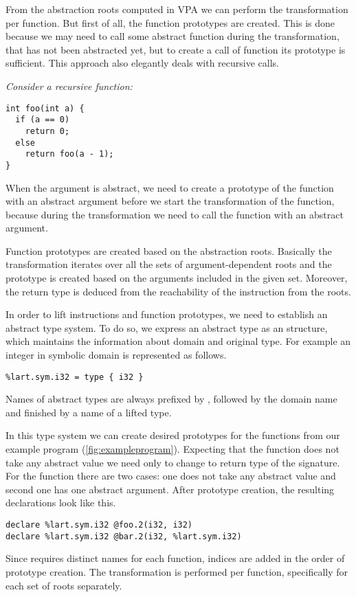 From the abstraction roots computed in VPA we can perform the transformation per
function. But first of all, the function prototypes are created. This is done
because we may need to call some abstract function during the transformation,
that has not been abstracted yet, but to create a call of function its prototype
is sufficient. This approach also elegantly deals with recursive calls.
\begin{marginfigure}
\itshape
Consider a recursive function:
\begin{verbatim}
int foo(int a) {
  if (a == 0)
    return 0;
  else
    return foo(a - 1);
}
\end{verbatim}
    When the argument  is abstract, we need to create a prototype of
    the function  with an abstract argument before we start the
    transformation of the function, because during the transformation we need to
    call the function  with an abstract argument.
\end{marginfigure}

Function prototypes are created based on the abstraction roots. Basically
the transformation iterates over all the sets of argument-dependent roots and
the prototype is created based on the arguments included in the given set.
Moreover, the return type is deduced from the reachability of the  instruction
from the roots.

In order to lift \LLVM instructions and function prototypes, we need to
establish an abstract type system. To do so, we express an abstract type as an
\LLVM structure, which maintains the information about domain and original
type. For example an integer in symbolic domain is represented as follows.

\begin{verbatim}
%lart.sym.i32 = type { i32 }
\end{verbatim}

Names of abstract types are always prefixed by , followed by the
domain name and finished by a name of a lifted \LLVM type.

In this type system we can create desired prototypes for the functions from our
example program (\autoref{fig:exampleprogram}). Expecting that the function 
does not take any abstract value we need only to change to return type of the
signature. For the function  there are two cases: one does not take any
abstract value and second one has one abstract argument. After prototype
creation, the resulting \LLVM declarations look like this.
\begin{verbatim}
declare %lart.sym.i32 @foo.2(i32, i32)
declare %lart.sym.i32 @bar.2(i32, %lart.sym.i32)
\end{verbatim}
Since \LLVM requires distinct names for each function, indices are added in
the order of prototype creation. The transformation is performed per function,
specifically for each set of roots separately.

